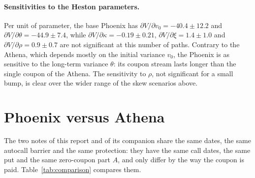 \documentclass[11pt,a4paper]{article}
\begin{document}
\paragraph{Sensitivities to the Heston parameters.} Per unit of parameter, the base Phoenix has
$\partial V/\partial v_0 = -40.4 \pm 12.2$ and $\partial V/\partial \theta = -44.9 \pm 7.4$, while
$\partial V/\partial \kappa = -0.19 \pm 0.21$, $\partial V/\partial \xi = 1.4 \pm 1.0$ and
$\partial V/\partial \rho = 0.9 \pm 0.7$ are not significant at this number of paths. Contrary to the Athena, which
depends mostly on the initial variance $v_0$, the Phoenix is as sensitive to the long-term variance $\theta$: its coupon
stream lasts longer than the single coupon of the Athena. The sensitivity to $\rho$, not significant for a small bump,
is clear over the wider range of the skew scenarios above.

\section{Phoenix versus Athena}\label{sec:comparison}
The two notes of this report and of its companion \cite{benguedda2026athena} share the same dates, the same
autocall barrier and the same protection: they have the same call dates, the same put and the same zero-coupon part
$A$, and only differ by the way the coupon is paid. Table~\ref{tab:comparison} compares them.
\end{document}
